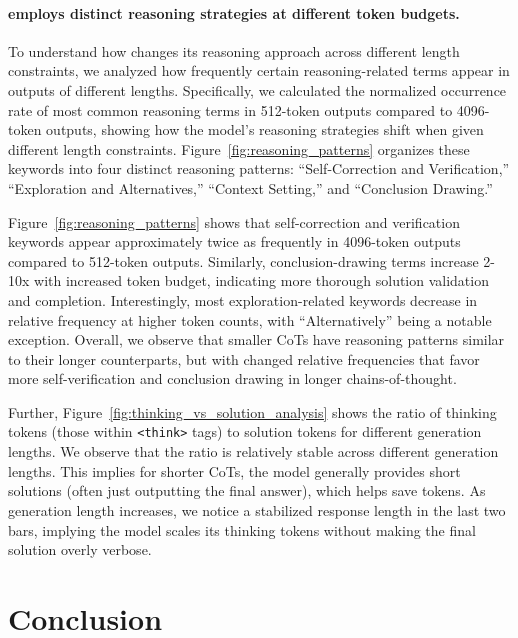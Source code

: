 \paragraph{\model{} employs distinct reasoning strategies at different token budgets.}



To understand how \model{} changes its reasoning approach across different length constraints, we analyzed how frequently certain reasoning-related terms appear in outputs of different lengths. 
Specifically, we calculated the normalized occurrence rate of most common reasoning terms in 512-token outputs compared to 4096-token outputs, showing how the model's reasoning strategies shift when given different length constraints. 
Figure~\ref{fig:reasoning_patterns} organizes these keywords into four distinct reasoning patterns: ``Self-Correction and Verification,'' ``Exploration and Alternatives,'' ``Context Setting,'' and ``Conclusion Drawing.''



Figure~\ref{fig:reasoning_patterns} shows that self-correction and verification keywords appear approximately twice as frequently in 4096-token outputs compared to 512-token outputs. Similarly, conclusion-drawing terms increase 2-10x with increased token budget, indicating more thorough solution validation and completion. 
Interestingly, most exploration-related keywords decrease in relative frequency at higher token counts, with ``Alternatively'' being a notable exception. Overall, we observe that smaller CoTs have reasoning patterns similar to their longer counterparts, but with changed relative frequencies that favor more self-verification and conclusion drawing in longer chains-of-thought. 


Further, Figure~\ref{fig:thinking_vs_solution_analysis} shows the ratio of thinking tokens (those within \texttt{<think>} tags) to solution tokens for different generation lengths. We observe that the ratio is relatively stable across different generation lengths. This implies for shorter CoTs, the model generally provides short solutions (often just outputting the final answer), which helps save tokens. As generation length increases, we notice a stabilized response length in the last two bars, implying the model scales its thinking tokens without making the final solution overly verbose.


\section{Conclusion}

